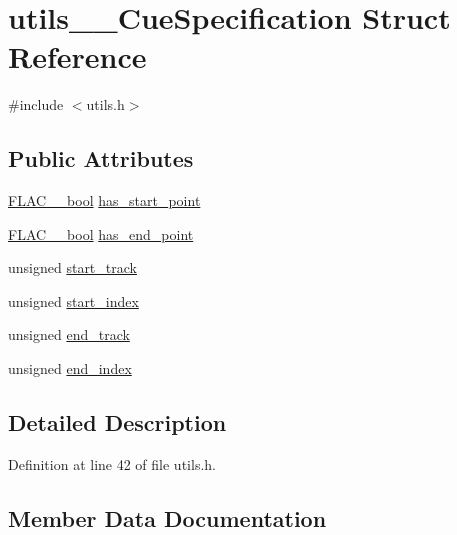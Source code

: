 \hypertarget{structutils_____cue_specification}{}\section{utils\+\_\+\+\_\+\+Cue\+Specification Struct Reference}
\label{structutils_____cue_specification}


{\ttfamily \#include $<$utils.\+h$>$}

\subsection*{Public Attributes}
\begin{DoxyCompactItemize}
\item 
\hyperlink{ordinals_8h_a95103469f1cbd78b8cf250194985b34e}{F\+L\+A\+C\+\_\+\+\_\+bool} \hyperlink{structutils_____cue_specification_a1db538512a5cf1bbef062aa67778b1a6}{has\+\_\+start\+\_\+point}
\item 
\hyperlink{ordinals_8h_a95103469f1cbd78b8cf250194985b34e}{F\+L\+A\+C\+\_\+\+\_\+bool} \hyperlink{structutils_____cue_specification_ab737b2555e312a8e7fe84dace304773e}{has\+\_\+end\+\_\+point}
\item 
unsigned \hyperlink{structutils_____cue_specification_ac5ce7cc8b30333cfeb3306534ba6ea51}{start\+\_\+track}
\item 
unsigned \hyperlink{structutils_____cue_specification_ad564653c495af6d5fcf87f0d0ab1df5e}{start\+\_\+index}
\item 
unsigned \hyperlink{structutils_____cue_specification_a0f1060c9d1cfc542fc8d551133560540}{end\+\_\+track}
\item 
unsigned \hyperlink{structutils_____cue_specification_a0ad9e9085e44a9672537a1a932e5f517}{end\+\_\+index}
\end{DoxyCompactItemize}


\subsection{Detailed Description}


Definition at line 42 of file utils.\+h.



\subsection{Member Data Documentation}
